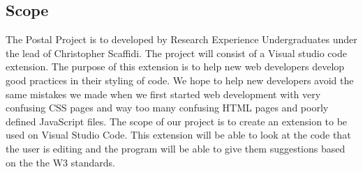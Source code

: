 \documentclass[letterpaper,10pt,titlepage,draftclsnofoot,onecolumn] {IEEEtran}
\begin{document}
\subsection{Scope}
The Postal Project is to developed by Research Experience Undergraduates under the lead of Christopher Scaffidi. 
The project will consist of a Visual studio code extension.
The purpose of this extension is to help new web developers develop good practices in their styling of code.
We hope to help new developers avoid the same mistakes we made when we first started web development with very confusing CSS pages and way too many confusing HTML pages and poorly defined JavaScript files.
The scope of our project is to create an extension to be used on Visual Studio Code. 
This extension will be able to look at the code that the user is editing and the program will be able to give them suggestions based on the the W3 standards. 
\end{document}

